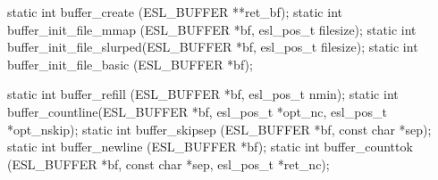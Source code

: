 \begin{cchunk}
static int buffer_create           (ESL_BUFFER **ret_bf);
static int buffer_init_file_mmap   (ESL_BUFFER *bf, esl_pos_t filesize);
static int buffer_init_file_slurped(ESL_BUFFER *bf, esl_pos_t filesize);
static int buffer_init_file_basic  (ESL_BUFFER *bf);

static int buffer_refill   (ESL_BUFFER *bf, esl_pos_t nmin);
static int buffer_countline(ESL_BUFFER *bf, esl_pos_t *opt_nc, esl_pos_t *opt_nskip);
static int buffer_skipsep  (ESL_BUFFER *bf, const char *sep);
static int buffer_newline  (ESL_BUFFER *bf);
static int buffer_counttok (ESL_BUFFER *bf, const char *sep, esl_pos_t *ret_nc);
\end{cchunk}
